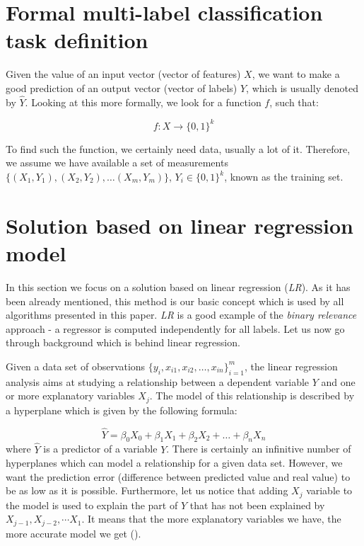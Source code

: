 \section{Formal multi-label classification task definition}

Given the value of an input vector (vector of features) $X$, we want to make a good prediction of an output vector (vector of labels) $Y$, which is usually denoted by $\hat{Y}$. Looking at this more formally, we look for a function $f$, such that:   

\begin{equation}\label{eq:def}
    f: X \rightarrow \{0,1\}^k 
\end{equation}

To find such the function, we certainly need data, usually a lot of it. Therefore, we assume we have available a set of measurements $\{(X_1, Y_1), (X_2, Y_2), \dots (X_m, Y_m)\}$, $Y_i\in\{0,1\}^k$, known as the training set.  

\section{Solution based on linear regression model}

In this section we focus on a solution based on linear regression (\textit{LR}). As it has been already mentioned, this method is our basic concept which is used by all algorithms presented in this paper. \textit{LR} is a good example of the \textit{binary relevance} approach - a regressor is computed independently for all labels. Let us now go through background which is behind linear regression. 

Given a data set of observations $\{y_i, x_{i1}, x_{i2}, \dots, x_{in}\}_{i=1}^{m}$, the linear regression analysis aims at studying a relationship between a dependent variable $Y$ and one or more explanatory variables $X_{j}$. The model of this relationship is described by a hyperplane which is given by the following formula:

\begin{equation}\label{eq:LR1}
    \hat{Y} = \beta_0X_{0} + \beta_1X_{1} + \beta_2X_{2} + \dots + \beta_nX_{n}
\end{equation}
where $\hat{Y}$ is a predictor of a variable $Y$. 
There is certainly an infinitive number of hyperplanes which can model a relationship for a given data set. However, we want the prediction error (difference between predicted value and real value) to be as low as it is possible. Furthermore, let us notice that adding $X_j$ variable to the model is used to explain the part of $Y$ that has not been explained by $X_{j-1}, X_{j-2}, \cdots X_1$. It means that the more explanatory variables we have, the more accurate model we get (\cite{Weisberg}).

